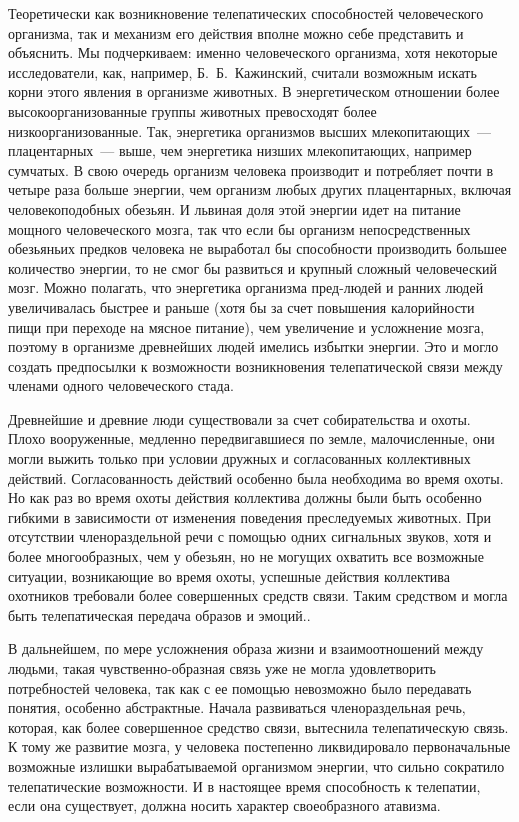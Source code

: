 \documentclass[12pt,a4paper,twoside,openany,svgnames]{memoir}
\begin{document}
Теоретически как возникновение телепатических способностей человеческого организма, так и механизм его действия вполне можно себе представить и объяснить. Мы подчеркиваем: именно человеческого организма, хотя некоторые исследователи, как, например, Б.~Б.~Кажинский, считали возможным искать корни этого явления в организме животных. В энергетическом отношении более высокоорганизованные группы животных превосходят более низкоорганизованные. Так, энергетика организмов высших млекопитающих~--- плацентарных~--- выше, чем энергетика низших млекопитающих, например сумчатых. В свою очередь организм человека производит и потребляет почти в четыре раза больше энергии, чем организм любых других плацентарных, включая человекоподобных обезьян. И львиная доля этой энергии идет на питание мощного человеческого мозга, так что если бы организм непосредственных обезьяньих предков человека не выработал бы способности производить большее количество энергии, то не смог бы развиться и крупный сложный человеческий мозг. Можно полагать, что энергетика организма пред-людей и ранних людей увеличивалась быстрее и раньше (хотя бы за счет повышения калорийности пищи при переходе на мясное питание), чем увеличение и усложнение мозга, поэтому в организме древнейших людей имелись избытки энергии. Это и могло создать предпосылки к возможности возникновения телепатической связи между членами одного человеческого стада.

Древнейшие и древние люди существовали за счет собирательства и охоты. Плохо вооруженные, медленно передвигавшиеся по земле, малочисленные, они могли выжить только при условии дружных и согласованных коллективных действий. Согласованность действий особенно была необходима во время охоты. Но как раз во время охоты действия коллектива должны были быть особенно гибкими в зависимости от изменения поведения преследуемых животных. При отсутствии членораздельной речи с помощью одних сигнальных звуков, хотя и более многообразных, чем у обезьян, но не могущих охватить все возможные ситуации, возникающие во время охоты, успешные действия коллектива охотников требовали более совершенных средств связи. Таким средством и могла быть телепатическая передача образов и эмоций..

В дальнейшем, по мере усложнения образа жизни и взаимоотношений между людьми, такая чувственно-образная связь уже не могла удовлетворить потребностей человека, так как с ее помощью невозможно было передавать понятия, особенно абстрактные. Начала развиваться членораздельная речь, которая, как более совершенное средство связи, вытеснила телепатическую связь. К тому же развитие мозга, у человека постепенно ликвидировало первоначальные возможные излишки вырабатываемой организмом энергии, что сильно сократило телепатические возможности. И в настоящее время способность к телепатии, если она существует, должна носить характер своеобразного атавизма.
\end{document}
